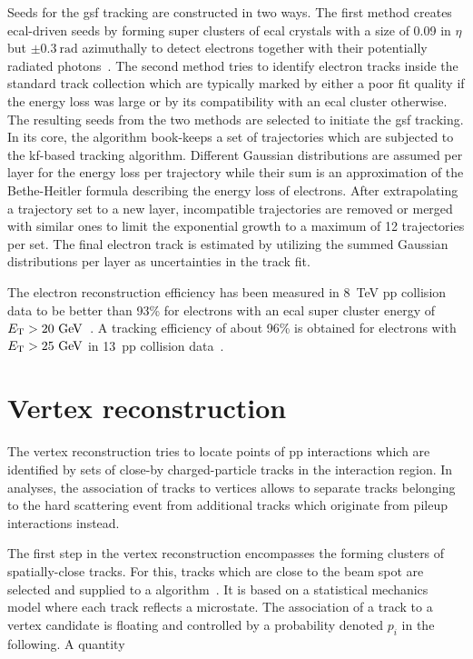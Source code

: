 Seeds for the \gls{gsf} tracking are constructed in two ways. The first method creates \gls{ecal}-driven seeds by forming super clusters of \gls{ecal} crystals with a size of 0.09 in $\eta$ but $\pm0.3~\mathrm{rad}$ azimuthally to detect electrons together with their potentially radiated photons~\cite{CMS:2010aua}. The second method tries to identify electron tracks inside the standard track collection which are typically marked by either a poor fit quality if the energy loss was large or by its compatibility with an \gls{ecal} cluster otherwise. The resulting seeds from the two methods are selected to initiate the \gls{gsf} tracking. In its core, the algorithm book-keeps a set of trajectories which are subjected to the \gls{kf}-based tracking algorithm. Different Gaussian distributions are assumed per layer for the energy loss per trajectory while their sum is an approximation of the Bethe-Heitler formula describing the energy loss of electrons. After extrapolating a trajectory set to a new layer, incompatible trajectories are removed or merged with similar ones to limit the exponential growth to a maximum of 12 trajectories per set. The final electron track is estimated by utilizing the summed Gaussian distributions per layer as uncertainties in the track fit. 

The electron reconstruction efficiency has been measured in 8~TeV \gls{pp} collision data to be better than 93\% for electrons with an \gls{ecal} super cluster energy of $E_\mathrm{T}>20~\textrm{GeV}$~\cite{Khachatryan:2015hwa}. A tracking efficiency of about 96\% is obtained for electrons with $E_\mathrm{T}>25~\textrm{GeV}$ in 13~\TeV \gls{pp} collision data~\cite{CMS-DP-2017-004}.



\section{Vertex reconstruction}


The vertex reconstruction tries to locate points of \gls{pp} interactions which are identified by sets of close-by charged-particle tracks in the interaction region. In analyses, the association of tracks to vertices allows to separate tracks belonging to the hard scattering event from additional tracks which originate from pileup interactions instead.

The first step in the vertex reconstruction encompasses the forming clusters of spatially-close tracks. For this, tracks which are close to the beam spot are selected and supplied to a  algorithm~\cite{726788}. It is based on a statistical mechanics model where each track reflects a microstate. The association of a track to a vertex candidate is floating and controlled by a probability denoted $p_{i}$ in the following. A quantity

